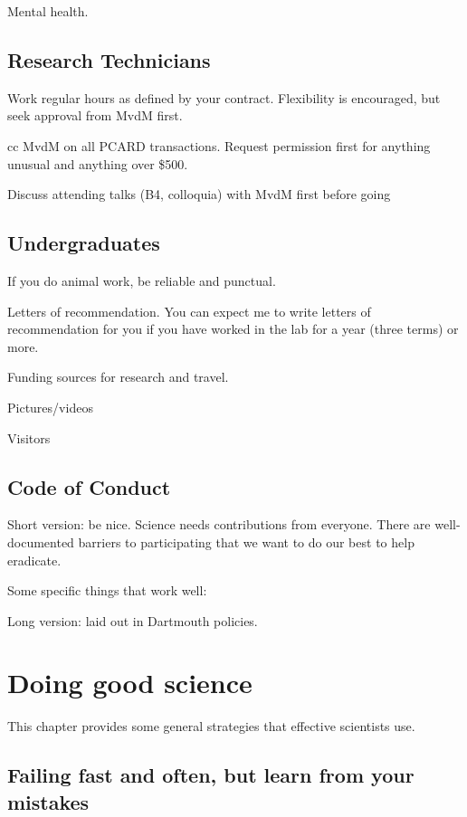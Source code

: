 \documentclass{tufte-book}
\begin{document}
Mental health.

\section{Research Technicians}

Work regular hours as defined by your contract. Flexibility is
encouraged, but seek approval from MvdM first.

cc MvdM on all PCARD transactions. Request permission first for
anything unusual and anything over \$500.

Discuss attending talks (B4, colloquia) with MvdM first before going

\section{Undergraduates}

If you do animal work, be reliable and punctual.

Letters of recommendation. You can expect me to write letters of
recommendation for you if you have worked in the lab for a year (three
terms) or more.

Funding sources for research and travel.

Pictures/videos

Visitors

\section{Code of Conduct}

Short version: be nice. Science needs contributions from
everyone. There are well-documented barriers to participating that we
want to do our best to help eradicate.

Some specific things that work well:

Long version: laid out in Dartmouth policies.

\chapter{Doing good science}

This chapter provides some general strategies that effective
scientists use.

\section{Failing fast and often, but learn from your mistakes}
\end{document}
